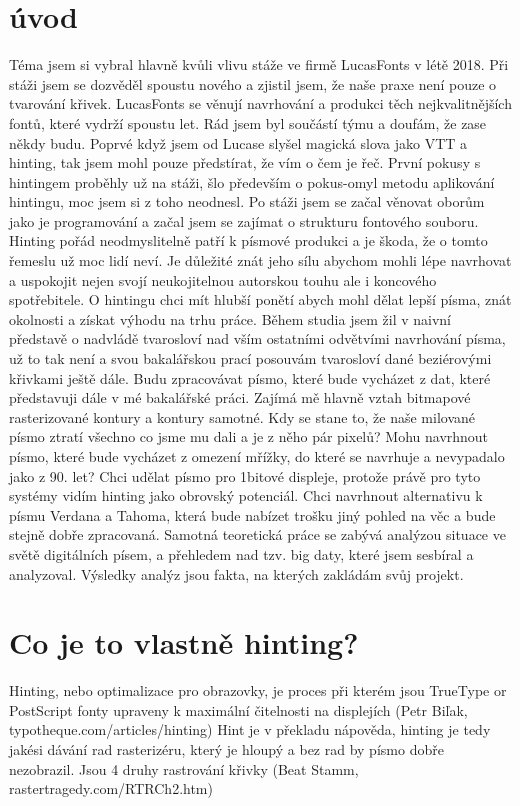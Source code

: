 \documentclass[a4paper]{article}
\begin{document}
\section{úvod}
\setcounter{page}{1}
Téma jsem si vybral hlavně kvůli vlivu stáže ve firmě LucasFonts v létě 2018. Při stáži jsem se dozvěděl spoustu nového a zjistil jsem, že naše praxe není pouze o tvarování křivek. LucasFonts se věnují navrhování a produkci těch nejkvalitnějších fontů, které vydrží spoustu let. Rád jsem byl součástí týmu a doufám, že zase někdy budu. Poprvé když jsem od Lucase slyšel magická slova jako VTT a hinting, tak jsem mohl pouze předstírat, že vím o čem je řeč. První pokusy s hintingem proběhly už na stáži, šlo především o pokus-omyl metodu aplikování hintingu, moc jsem si z toho neodnesl. Po stáži jsem se začal věnovat oborům jako je programování a začal jsem se zajímat o strukturu fontového souboru. Hinting pořád neodmyslitelně patří k písmové produkci a je škoda, že o tomto řemeslu už moc lidí neví. Je důležité znát jeho sílu abychom mohli lépe navrhovat a uspokojit nejen svojí neukojitelnou autorskou touhu ale i koncového spotřebitele. O hintingu chci mít hlubší ponětí abych mohl dělat lepší písma, znát okolnosti a získat výhodu na trhu práce. Během studia jsem žil v naivní představě o nadvládě tvarosloví nad vším ostatními odvětvími navrhování písma, už to tak není a svou bakalářskou prací posouvám tvarosloví dané beziérovými křivkami ještě dále. Budu zpracovávat písmo, které bude vycházet z dat, které představuji dále v mé bakalářské práci. Zajímá mě hlavně vztah bitmapové rasterizované kontury a kontury samotné. Kdy se stane to, že naše milované písmo ztratí všechno co jsme mu dali a je z něho pár pixelů? Mohu navrhnout písmo, které bude vycházet z omezení mřížky, do které se navrhuje a nevypadalo jako z 90. let? Chci udělat písmo pro 1bitové displeje, protože právě pro tyto systémy vidím hinting jako obrovský potenciál. Chci navrhnout alternativu k písmu Verdana a Tahoma, která bude nabízet trošku jiný pohled na věc a bude stejně dobře zpracovaná. Samotná teoretická práce se zabývá analýzou situace ve světě digitálních písem, a přehledem nad tzv. big daty, které jsem sesbíral a analyzoval. Výsledky analýz jsou fakta, na kterých zakládám svůj projekt.

\section{Co je to vlastně hinting?}

Hinting, nebo optimalizace pro obrazovky, je proces při kterém jsou TrueType or PostScript fonty upraveny k maximální čitelnosti na displejích (Petr Biľak, typotheque.com/articles/hinting) Hint je v překladu nápověda, hinting je tedy jakési dávání rad rasterizéru, který je hloupý a bez rad by písmo dobře nezobrazil. Jsou 4 druhy rastrování křivky (Beat Stamm, rastertragedy.com/RTRCh2.htm)
\end{document}
